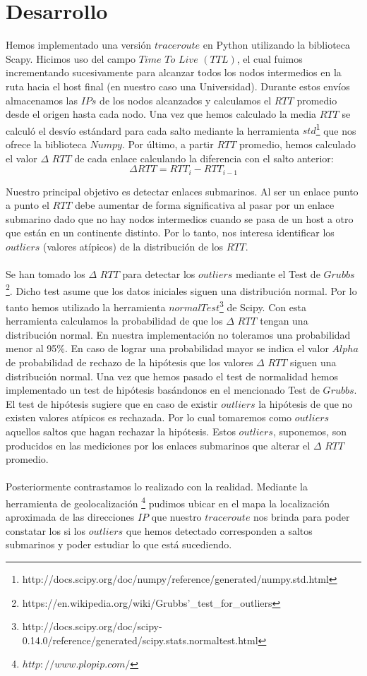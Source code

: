 \section{Desarrollo}

Hemos implementado una versión $traceroute$ en Python utilizando la biblioteca Scapy. 
Hicimos uso del campo $Time$ $To$ $Live$ $(TTL)$, el cual fuimos incrementando sucesivamente para alcanzar todos los nodos intermedios en la ruta 
hacia el host final (en nuestro caso una Universidad). 
Durante estos envíos almacenamos las $IPs$ de los nodos alcanzados y calculamos el $RTT$ promedio desde el origen hasta cada nodo. 
Una vez que hemos calculado la media $RTT$ se calculó el desvío estándard para cada salto mediante la herramienta $std$\footnote{http://docs.scipy.org/doc/numpy/reference/generated/numpy.std.html} 
que nos ofrece la biblioteca $Numpy$.
Por último, a partir $RTT$ promedio, hemos calculado el valor $\Delta$ $RTT$ de cada enlace calculando la diferencia con el salto anterior:
\begin{equation}
 \Delta RTT = RTT_{i} - RTT_{i-1}
\end{equation}

Nuestro principal objetivo es detectar enlaces submarinos. Al ser un enlace punto a punto el $RTT$ debe aumentar de forma significativa al 
pasar por un enlace submarino dado que no hay nodos intermedios cuando se pasa de un host a otro que están en un continente distinto. Por lo tanto, 
nos interesa identificar los $outliers$ (valores atípicos) de la distribución de los $RTT$.\\\\ 
Se han tomado los $\Delta$ $RTT$ para detectar los $outliers$ mediante el Test de $Grubbs$\footnote{https://en.wikipedia.org/wiki/Grubbs'\_test\_for\_outliers}. 
Dicho test asume que los datos iniciales siguen una distribución normal. 
Por lo tanto hemos utilizado la herramienta $normalTest$\footnote{http://docs.scipy.org/doc/scipy-0.14.0/reference/generated/scipy.stats.normaltest.html} de Scipy. 
Con esta herramienta calculamos la probabilidad de que los $\Delta$ $RTT$ tengan una distribución normal. En nuestra implementación
no toleramos una probabilidad menor al 95\%. En caso de lograr una probabilidad mayor se indica el valor $Alpha$ de probabilidad de rechazo de la hipótesis
que los valores $\Delta$ $RTT$ siguen una distribución normal.
Una vez que hemos pasado el test de normalidad hemos implementado un test de hipótesis basándonos en el mencionado Test de $Grubbs$. 
El test de hipótesis sugiere que en caso de existir $outliers$ la hipótesis de que no existen valores atípicos es rechazada. Por lo cual tomaremos como
$outliers$ aquellos saltos que hagan rechazar la hipótesis. Estos $outliers$, suponemos, son producidos en las mediciones por los enlaces submarinos 
que alterar el $\Delta$ $RTT$ promedio.\\\\
Posteriormente contrastamos lo realizado con la realidad. Mediante la herramienta de geolocalización \footnote{$http://www.plopip.com/$} pudimos 
ubicar en el mapa la localización aproximada de las direcciones $IP$ que nuestro $traceroute$ nos brinda para poder constatar los si los $outliers$ 
que hemos detectado corresponden a saltos submarinos y poder estudiar lo que está sucediendo.
